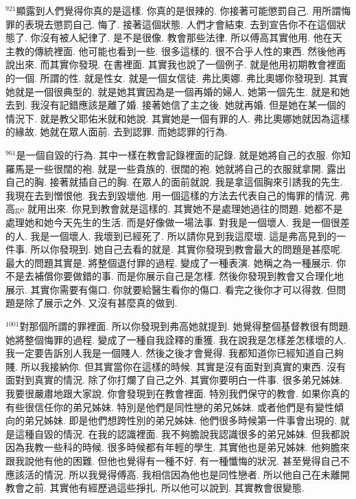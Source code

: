 \documentclass{book}
\begin{document}
$^{921}$顯露到人們覺得你真的是這樣.
你真的是很辣的.
你接著可能懲罰自己.
用所謂悔罪的表現去懲罰自己.
悔了.
接著這個狀態.
人們才會結束.
去到宣告你不在這個狀態了.
你沒有被人紀律了.
是不是很像.
教會那些法律.
所以傅高其實他用.
他在天主教的傳統裡面.
他可能也看到一些.
很多這樣的.
很不合乎人性的東西.
然後他再說出來.
而其實你發現.
在書裡面.
其實我也說了一個例子.
就是他用初期教會裡面的一個.
所謂的性.
就是性女.
就是一個女信徒.
弗比奧娜.
弗比奧娜你發現到.
其實她就是一個很典型的.
就是她其實因為是一個再婚的婦人.
她第一個先生.
就是和她去到.
我沒有記錯應該是離了婚.
接著她信了主之後.
她就再婚.
但是她在某一個的情況下.
就是教父耶佑米就和她說.
其實她是一個有罪的人.
弗比奧娜她就因為這樣的緣故.
她就在眾人面前.
去到認罪.
而她認罪的行為.

$^{961}$是一個自毀的行為.
其中一樣在教會記錄裡面的記錄.
就是她將自己的衣服.
你知羅馬是一些很闊的袍.
就是一些貴族的.
很闊的袍.
她就將自己的衣服就拿開.
露出自己的胸.
接著就插自己的胸.
在眾人的面前就說.
我是拿這個胸來引誘我的先生.
我現在去到憎恨他.
我去到毀壞他.
用一個這樣的方法去代表自己的悔罪的情況.
弗高ge 就用出來.
你見到教會就是這樣的.
其實她不是處理她過往的問題.
她都不是處理她和她今天先生的生活.
而是好像做一場法事.
對我是一個壞人.
我是一個很差的人.
我是一個壞人.
我壞到已經死了.
所以請你見到我這麼壞.
這是弗高見到的一件事.
所以你發現到.
她自己去看的就是.
其實你發現到教會最大的問題是甚麼呢.
最大的問題其實是.
將整個退付罪的過程.
變成了一種表演.
她稱之為一種展示.
你不是去補償你要做錯的事.
而是你展示自己是怎樣.
然後你發現到教會又合理化地展示.
其實你需要有傷口.
你就要給醫生看你的傷口.
看完之後你才可以得救.
但問題是除了展示之外.
又沒有甚麼真的做到.

$^{1001}$對那個所謂的罪裡面.
所以你發現到弗高她就提到.
她覺得整個基督教很有問題.
她將整個悔罪的過程.
變成了一種自我詮釋的重獲.
我在說我是怎樣差怎樣壞的人.
我一定要告訴別人我是一個賤人.
然後之後才會覺得.
我都知道你已經知道自己夠賤.
所以我接納你.
但其實當你在這樣的時候.
其實是沒有面對到真實的東西.
沒有面對到真實的情況.
除了你打爛了自己之外.
其實你要明白一件事.
很多弟兄姊妹.
我要很嚴肅地跟大家說.
你會發現到在教會裡面.
特別我們保守的教會.
如果你真的有些很信任你的弟兄姊妹.
特別是他們是同性戀的弟兄姊妹.
或者他們是有變性傾向的弟兄姊妹.
即是他們想跨性別的弟兄姊妹.
他們很多時候第一件事會出現的.
就是這種自毀的情況.
在我的認識裡面.
我不夠膽說我認識很多的弟兄姊妹.
但我都說因為我教一些科的時候.
很多時候都有年輕的學生.
其實他也是弟兄姊妹.
他夠膽來跟我說他有他的困難.
但他也覺得有一種不好.
有一種懺悔的狀況.
甚至覺得自己不應該活的情況.
所以我覺得傅高.
我相信因為他也是同性戀者.
所以他自己在未離開教會之前.
其實他有經歷過這些掙扎.
所以他可以說到.
其實教會很變態.
\end{document}
